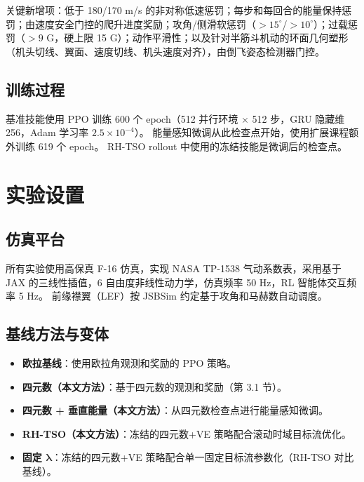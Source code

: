 \documentclass{article}
\begin{document}
关键新增项：低于 180/170 m/s 的非对称低速惩罚；每步和每回合的能量保持惩罚；由速度安全门控的爬升进度奖励；攻角/侧滑软惩罚（$>15^\circ$/$>10^\circ$）；过载惩罚（$>9$ G，硬上限 15 G）；动作平滑性；以及针对半筋斗机动的环面几何塑形（机头切线、翼面、速度切线、机头速度对齐），由倒飞姿态检测器门控。

\subsection{训练过程}

基准技能使用 PPO 训练 600 个 epoch（512 并行环境 $\times$ 512 步，GRU 隐藏维 256，Adam 学习率 $2.5\times10^{-4}$）。
能量感知微调从此检查点开始，使用扩展课程额外训练 619 个 epoch。
RH-TSO rollout 中使用的冻结技能是微调后的检查点。


\section{实验设置}

\subsection{仿真平台}

所有实验使用高保真 F-16 仿真，实现 NASA TP-1538 气动系数表，采用基于 JAX 的三线性插值，6 自由度非线性动力学，仿真频率 50 Hz，RL 智能体交互频率 5 Hz。
前缘襟翼（LEF）按 JSBSim 约定基于攻角和马赫数自动调度。

\subsection{基线方法与变体}

\begin{itemize}
  \item \textbf{欧拉基线}：使用欧拉角观测和奖励的 PPO 策略。
  \item \textbf{四元数（本文方法）}：基于四元数的观测和奖励（第 3.1 节）。
  \item \textbf{四元数 + 垂直能量（本文方法）}：从四元数检查点进行能量感知微调。
  \item \textbf{RH-TSO（本文方法）}：冻结的四元数+VE 策略配合滚动时域目标流优化。
  \item \textbf{固定 $\bm{\lambda}$}：冻结的四元数+VE 策略配合单一固定目标流参数化（RH-TSO 对比基线）。
\end{itemize}
\end{document}
